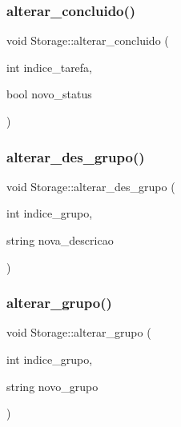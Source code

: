 \subsubsection{\texorpdfstring{alterar\+\_\+concluido()}{alterar\_concluido()}}
{\footnotesize\ttfamily void Storage\+::alterar\+\_\+concluido (\begin{DoxyParamCaption}\item[{int}]{indice\+\_\+tarefa,  }\item[{bool}]{novo\+\_\+status }\end{DoxyParamCaption})}

\mbox{\label{classStorage_af487be83a5acaf49850f9fff02e0e30f}} 
\subsubsection{\texorpdfstring{alterar\+\_\+des\+\_\+grupo()}{alterar\_des\_grupo()}}
{\footnotesize\ttfamily void Storage\+::alterar\+\_\+des\+\_\+grupo (\begin{DoxyParamCaption}\item[{int}]{indice\+\_\+grupo,  }\item[{string}]{nova\+\_\+descricao }\end{DoxyParamCaption})}

\mbox{\label{classStorage_a9ffb7a7dad34dc12d3dc4e6808e5f431}} 
\subsubsection{\texorpdfstring{alterar\+\_\+grupo()}{alterar\_grupo()}}
{\footnotesize\ttfamily void Storage\+::alterar\+\_\+grupo (\begin{DoxyParamCaption}\item[{int}]{indice\+\_\+grupo,  }\item[{string}]{novo\+\_\+grupo }\end{DoxyParamCaption})}

\mbox{\label{classStorage_a3e7f675101378565f4f63d799e8408ae}} 
